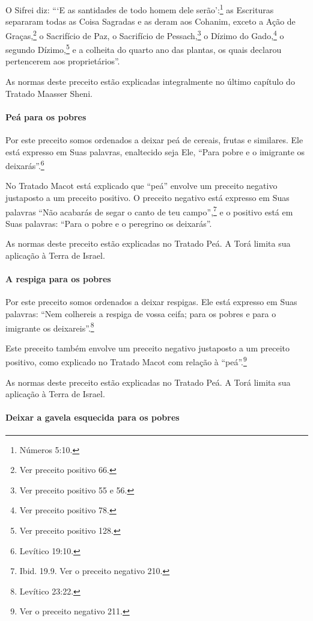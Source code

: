 O Sifrei diz: ```E as santidades de todo homem dele serão':\footnote{Números 5:10.} as Escrituras separaram todas as Coisa Sagradas e as deram
aos Cohanim, exceto a Ação de Graças,\footnote{Ver preceito positivo 66.} o Sacrifício de Paz, o Sacrifício de Pessach,\footnote{Ver preceito positivo 55 e 56.} o Dízimo do Gado,\footnote{Ver preceito positivo 78.} o segundo Dízimo,\footnote{Ver preceito positivo 128.} e a colheita do quarto ano
das plantas, os quais declarou pertencerem aos proprietários''.

As normas deste preceito estão explicadas integralmente no último
capítulo do Tratado Maasser Sheni.


\paragraph{Peá\star{} para os pobres}

Por este preceito somos ordenados a deixar peá\starr{}
de cereais, frutas e similares. Ele está expresso em Suas palavras,
enaltecido seja Ele, ``Para pobre e o imigrante os deixarás''.\footnote{Levítico 19:10.}

No Tratado Macot está explicado que ``peá'' envolve um preceito negativo
justaposto a um preceito positivo. O preceito negativo está expresso
em Suas palavras ``Não acabarás de segar o canto de teu campo'',\footnote{Ibid.
19.9. Ver o preceito negativo 210.} e o positivo está em Suas palavras: ``Para o pobre e o peregrino os
deixarás''.

As normas deste preceito estão explicadas no Tratado Peá. A Torá limita
sua aplicação à Terra de Israel.

\paragraph{A respiga para os pobres}

Por este preceito somos ordenados a deixar respigas. Ele está expresso
em Suas palavras: ``Nem colhereis a respiga de vossa ceifa; para os
pobres e para o imigrante os deixareis''.\footnote{Levítico 23:22.}

Este preceito também envolve um preceito negativo justaposto a um
preceito positivo, como explicado no Tratado Macot com relação à
``peá''.\footnote{Ver o preceito negativo 211.}


As normas deste preceito estão explicadas no Tratado Peá. A Torá limita
sua aplicação à Terra de Israel.

\paragraph{Deixar a gavela esquecida para os pobres}

